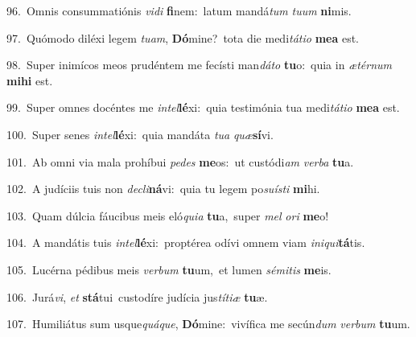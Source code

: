 {\numbfont\textcolor{\numbcolor}{96.}}~Omnis consummatiónis \textit{vi}\-\textit{di} \textbf{fi}\-nem:~\star latum mandá\textit{tum} \textit{tu}\-\textit{um} \textbf{ni}\-mis.\par
{\numbfont\textcolor{\numbcolor}{97.}}~Quómodo diléxi legem \textit{tu}\-\textit{am}, \textbf{Dó}\-mine?~\star tota die medi\-\textit{tá}\-\textit{ti}\textit{o} \textbf{me}\-\textbf{a} est.\par
{\numbfont\textcolor{\numbcolor}{98.}}~Super inimícos meos prudéntem me fecísti man\-\textit{dá}\-\textit{to} \textbf{tu}\-o:~\star quia in \textit{æ}\-\textit{tér}\textit{num} \textbf{mi}\-\textbf{hi} est.\par
{\numbfont\textcolor{\numbcolor}{99.}}~Super omnes docéntes me \textit{in}\-\textit{tel}\textbf{lé}xi:~\star quia testimónia tua medi\-\textit{tá}\-\textit{ti}\textit{o} \textbf{me}\-\textbf{a} est.\par
{\numbfont\textcolor{\numbcolor}{100.}}~Super senes \textit{in}\-\textit{tel}\textbf{lé}xi:~\star quia mandáta \textit{tu}\-\textit{a} \textit{quæ}\-\textbf{sí}vi.\par
{\numbfont\textcolor{\numbcolor}{101.}}~Ab omni via mala prohíbui \textit{pe}\-\textit{des} \textbf{me}\-os:~\star ut custódi\textit{am} \textit{ver}\-\textit{ba} \textbf{tu}\-a.\par
{\numbfont\textcolor{\numbcolor}{102.}}~A judíciis tuis non \textit{de}\-\textit{cli}\textbf{ná}vi:~\star quia tu legem po\-\textit{su}\-\textit{ís}\textit{ti} \textbf{mi}\-hi.\par
{\numbfont\textcolor{\numbcolor}{103.}}~Quam dúlcia fáucibus meis eló\-\textit{qui}\-\textit{a} \textbf{tu}\-a,~\star super \textit{mel} \textit{o}\-\textit{ri} \textbf{me}\-o!\par
{\numbfont\textcolor{\numbcolor}{104.}}~A mandátis tuis \textit{in}\-\textit{tel}\textbf{lé}xi:~\star proptérea odívi omnem viam \textit{in}\-\textit{i}\textit{qui}\textbf{tá}tis.\par
{\numbfont\textcolor{\numbcolor}{105.}}~Lucérna pédibus meis \textit{ver}\-\textit{bum} \textbf{tu}\-um,~\star et lumen \textit{sé}\-\textit{mi}\textit{tis} \textbf{me}\-is.\par
{\numbfont\textcolor{\numbcolor}{106.}}~Jurá\-\textit{vi}\-, \textit{et} \textbf{stá}\-tui~\star custodíre judícia jus\-\textit{tí}\-\textit{ti}\textit{æ} \textbf{tu}\-æ.\par
{\numbfont\textcolor{\numbcolor}{107.}}~Humiliátus sum usque\-\textit{quá}\-\textit{que}, \textbf{Dó}\-mine:~\star vivífica me secún\textit{dum} \textit{ver}\-\textit{bum} \textbf{tu}\-um.\par
